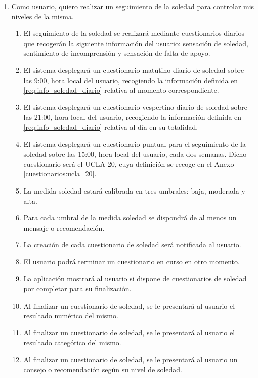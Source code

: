         \begin{enumerate}[resume=req-usuario,label=\textbf{\texttt{RU-\arabic*}}]
            \item Como usuario, quiero realizar un seguimiento de la soledad para controlar mis niveles de la misma.
            \begin{enumerate}[resume=req-funcionales,label=\textbf{\texttt{RF-\arabic*}}]
                \item \label{req:info_soledad_diario} El seguimiento de la soledad se realizará mediante cuestionarios diarios que recogerán la siguiente información del usuario: sensación de soledad, sentimiento de incomprensión y sensación de falta de apoyo.
                \item El sistema desplegará un cuestionario matutino diario de soledad sobre las 9:00, hora local del usuario, recogiendo la información definida en \ref{req:info_soledad_diario} relativa al momento correspondiente.
                \item  El sistema desplegará un cuestionario vespertino diario de soledad sobre las 21:00, hora local del usuario, recogiendo la información definida en \ref{req:info_soledad_diario} relativa al día en su totalidad.
                \item El sistema desplegará un cuestionario puntual para el seguimiento de la soledad sobre las 15:00, hora local del usuario, cada dos semanas. Dicho cuestionario será el UCLA-20, cuya definición se recoge en el Anexo \ref{cuestionarios:ucla_20}.
                \item La medida soledad estará calibrada en tres umbrales: baja, moderada y alta.
                \item Para cada umbral de la medida soledad se dispondrá de al menos un mensaje o recomendación.
                \item La creación de cada cuestionario de soledad será notificada al usuario.
                \item El usuario podrá terminar un cuestionario en curso en otro momento.
                \item La aplicación mostrará al usuario si dispone de cuestionarios de soledad por completar para su finalización.
                \item Al finalizar un cuestionario de soledad, se le presentará al usuario el resultado numérico del mismo.
                \item Al finalizar un cuestionario de soledad, se le presentará al usuario el resultado categórico del mismo.
                \item Al finalizar un cuestionario de soledad, se le presentará al usuario un consejo o recomendación según su nivel de soledad.
            \end{enumerate}
        \end{enumerate}

